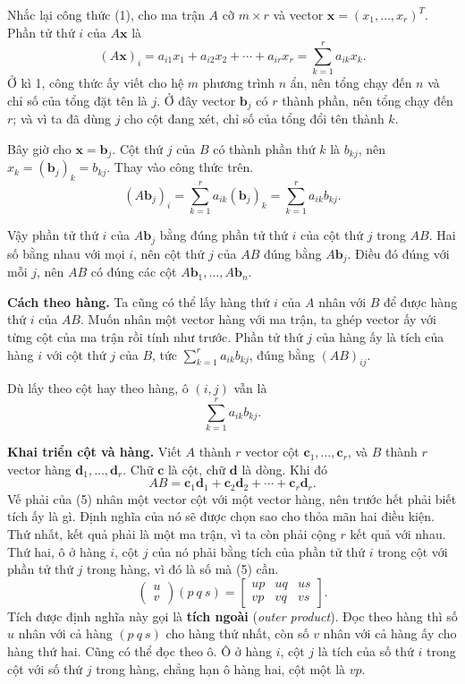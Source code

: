 \documentclass[12pt,a4paper]{article}
\begin{document}
Nhắc lại công thức (1), cho ma trận \(A\) cỡ \(m\times r\) và vector \(\mathbf{x}=(x_1,\ldots,x_r)^T\). Phần tử thứ \(i\) của \(A\mathbf{x}\) là
$$
(A\mathbf{x})_i=a_{i1}x_1+a_{i2}x_2+\cdots+a_{ir}x_r=\sum_{k=1}^{r}a_{ik}x_k.
$$
Ở kì 1, công thức ấy viết cho hệ \(m\) phương trình \(n\) ẩn, nên tổng chạy đến \(n\) và chỉ số của tổng đặt tên là \(j\). Ở đây vector \(\mathbf{b}_j\) có \(r\) thành phần, nên tổng chạy đến \(r\); và vì ta đã dùng \(j\) cho cột đang xét, chỉ số của tổng đổi tên thành \(k\).

Bây giờ cho \(\mathbf{x}=\mathbf{b}_j\). Cột thứ \(j\) của \(B\) có thành phần thứ \(k\) là \(b_{kj}\), nên \(x_k=(\mathbf{b}_j)_k=b_{kj}\). Thay vào công thức trên.
$$
(A\mathbf{b}_j)_i=\sum_{k=1}^{r}a_{ik}(\mathbf{b}_j)_k=\sum_{k=1}^{r}a_{ik}b_{kj}.
$$

Vậy phần tử thứ \(i\) của \(A\mathbf{b}_j\) bằng đúng phần tử thứ \(i\) của cột thứ \(j\) trong \(AB\). Hai số bằng nhau với mọi \(i\), nên cột thứ \(j\) của \(AB\) đúng bằng \(A\mathbf{b}_j\). Điều đó đúng với mỗi \(j\), nên \(AB\) có đúng các cột \(A\mathbf{b}_1,\ldots,A\mathbf{b}_n\).

\textbf{Cách theo hàng.} Ta cũng có thể lấy hàng thứ \(i\) của \(A\) nhân với \(B\) để được hàng thứ \(i\) của \(AB\). Muốn nhân một vector hàng với ma trận, ta ghép vector ấy với từng cột của ma trận rồi tính như trước. Phần tử thứ \(j\) của hàng ấy là tích của hàng \(i\) với cột thứ \(j\) của \(B\), tức \(\sum_{k=1}^{r}a_{ik}b_{kj}\), đúng bằng \((AB)_{ij}\).

Dù lấy theo cột hay theo hàng, ô \((i,j)\) vẫn là
$$
\sum_{k=1}^{r}a_{ik}b_{kj}.
$$

\textbf{Khai triển cột và hàng.} Viết \(A\) thành \(r\) vector cột \(\mathbf{c}_1,\ldots,\mathbf{c}_r\), và \(B\) thành \(r\) vector hàng \(\mathbf{d}_1,\ldots,\mathbf{d}_r\). Chữ \(\mathbf{c}\) là cột, chữ \(\mathbf{d}\) là dòng. Khi đó
$$
AB=\mathbf{c}_1\mathbf{d}_1+\mathbf{c}_2\mathbf{d}_2+\cdots+\mathbf{c}_r\mathbf{d}_r. \tag{5}
$$
Vế phải của (5) nhân một vector cột với một vector hàng, nên trước hết phải biết tích ấy là gì. Định nghĩa của nó sẽ được chọn sao cho thỏa mãn hai điều kiện. Thứ nhất, kết quả phải là một ma trận, vì ta còn phải cộng \(r\) kết quả với nhau. Thứ hai, ô ở hàng \(i\), cột \(j\) của nó phải bằng tích của phần tử thứ \(i\) trong cột với phần tử thứ \(j\) trong hàng, vì đó là số mà (5) cần.
$$
\left(\begin{array}{r}u\\v\end{array}\right)(p\ q\ s)
=\left[\begin{array}{rrr}up&uq&us\\vp&vq&vs\end{array}\right].
$$
Tích được định nghĩa này gọi là \textbf{tích ngoài} (\emph{outer product}). Đọc theo hàng thì số \(u\) nhân với cả hàng \((p\ q\ s)\) cho hàng thứ nhất, còn số \(v\) nhân với cả hàng ấy cho hàng thứ hai. Cũng có thể đọc theo ô. Ô ở hàng \(i\), cột \(j\) là tích của số thứ \(i\) trong cột với số thứ \(j\) trong hàng, chẳng hạn ô hàng hai, cột một là \(vp\).
\end{document}
